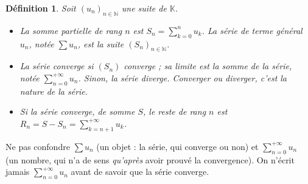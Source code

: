 \documentclass[a4paper,11pt]{article}
\numberwithin{equation}{section}
\numberwithin{figure}{section}
\numberwithin{table}{section}
\theoremstyle{enonce}
\newtheorem{definition}{Définition}[section]
\theoremstyle{exemple}
\theoremstyle{remarque}
\newcommand{\K}{\mathbb{K}}
\newcommand{\N}{\mathbb{N}}
\begin{document}
\begin{definition}
Soit $(u_n)_{n\in\N}$ une suite de $\K$.
\begin{itemize}
\item La \emph{somme partielle} de rang $n$ est $S_n=\sum_{k=0}^nu_k$. La \emph{série} de terme général $u_n$, notée $\sum u_n$, est
la suite $(S_n)_{n\in\N}$.
\item La série \emph{converge} si $(S_n)$ converge ; sa limite est la \emph{somme} de la série, notée $\displaystyle\sum_{n=0}^{+\infty}u_n$.
Sinon, la série \emph{diverge}. Converger ou diverger, c'est la \emph{nature} de la série.
\item Si la série converge, de somme $S$, le \emph{reste} de rang $n$ est $R_n=S-S_n=\displaystyle\sum_{k=n+1}^{+\infty}u_k$.
\end{itemize}
\end{definition}

\begin{attention}
Ne pas confondre $\sum u_n$ (un objet : la série, qui converge ou non) et $\sum_{n=0}^{+\infty}u_n$ (un nombre, qui n'a de sens
\emph{qu'après} avoir prouvé la convergence). On n'écrit jamais $\sum_{n=0}^{+\infty}u_n$ avant de savoir que la série converge.
\end{attention}
\end{document}
